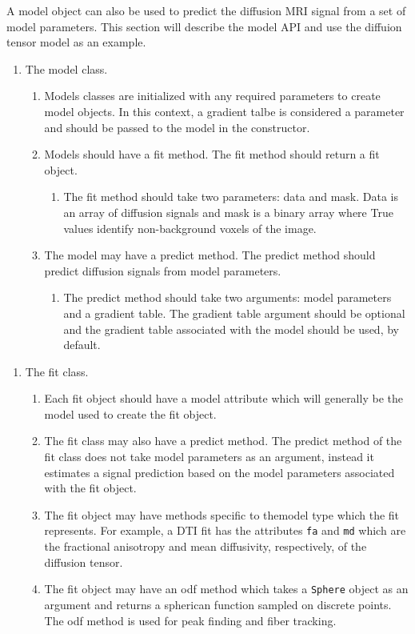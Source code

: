 A model object can also be used to predict the diffusion MRI signal from a set of model parameters. This section will describe the model API and use the diffuion tensor model as an example. 
\begin{enumerate}
\item The model class.
\begin{enumerate}
\item Models classes are initialized with any required parameters to create model objects. In this context, a gradient talbe is considered a parameter and should be passed to the model in the constructor.
\item Models should have a fit method. The fit method should return a fit object.
\begin{enumerate}
\item The fit method should take two parameters: data and mask. Data is an array of diffusion signals and mask is a binary array where True values identify non-background voxels of the image.
\end{enumerate}
\item The model may have a predict method. The predict method should predict diffusion signals from model parameters.
\begin{enumerate}
\item The predict method should take two arguments: model parameters and a gradient table. The gradient table argument should be optional and the gradient table associated with the model should be used, by default.
\end{enumerate}
\end{enumerate}
\end{enumerate}
\begin{enumerate}
    \item The fit class.
    \begin{enumerate}
        \item Each fit object should have a model attribute which will generally be the model used to create the fit object.
        \item The fit class may also have a predict method. The predict method of the fit class does not take model parameters as an argument, instead it estimates a signal prediction based on the model parameters associated with the fit object.
        \item The fit object may have methods specific to themodel type which the fit represents. For example, a DTI fit has the attributes \verb|fa| and \verb|md| which are the fractional anisotropy and mean diffusivity, respectively, of the diffusion tensor.
        \item The fit object may have an odf method which takes a \verb|Sphere| object as an argument and returns a spherican function sampled on discrete points. The odf method is used for peak finding and fiber tracking.
    \end{enumerate}
\end{enumerate}

